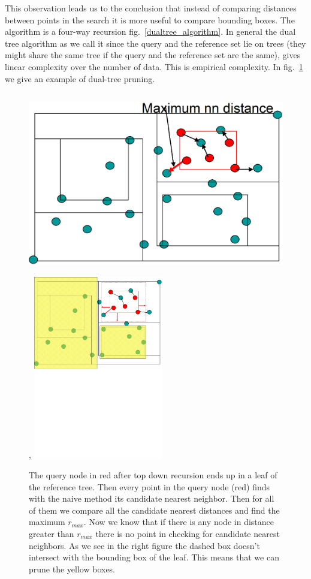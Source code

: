\documentclass[12pt,letterpaper,doublespaced,ETD,dvips,proposal]{gtthesis}
\begin{document}
\begin{Body}
This observation leads us to the conclusion that instead of
comparing distances between points in the search it is more useful
to compare bounding boxes. The algorithm is  a four-way recursion fig.~\ref{dualtree_algorithm}.
In general the dual tree algorithm as we call it since the query and
the reference set lie on trees (they might share the same tree if
the query and the reference set are the same), gives linear
complexity over the number of data. This is empirical complexity. In
fig.~\ref{dual_tree} we give an example of dual-tree pruning.

\begin{figure}[!htb]
\label{dual_tree}
\centerline{\includegraphics[height=8cm]{dual_tree_box_pruning1.eps},
            \includegraphics[height=8cm]{dual_tree_box_pruning.eps}}
\caption{The query node in red after top down recursion ends up in a leaf of
the reference tree. Then every point in the query node (red) finds
with the naive method its candidate nearest neighbor. Then for all
of them we compare all the candidate nearest distances and find the
maximum $r_{max}$. Now we know that if there is any node in distance
greater than $r_{max}$ there is no point in checking for candidate
nearest neighbors. As we see in the right figure the dashed box
doesn't intersect with the bounding box of the leaf. This means that
we can prune the yellow boxes.}
\end{figure}


\end{Body}
\end{document}
